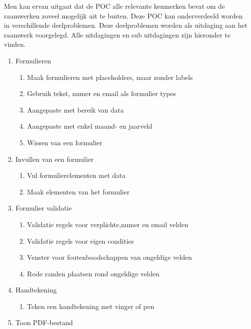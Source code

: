 Men kan ervan uitgaat dat de POC alle relevante kenmerken bevat om de raamwerken zoveel mogelijk uit te buiten. 
Deze POC kan onderverdeeld worden in verschillende deelproblemen.
Deze deelproblemen worden als uitdaging aan het raamwerk voorgelegd.
Alle uitdagingen en sub uitdagingen zijn hieronder te vinden.

\begin{enumerate}[label*=U \arabic*.]
\item \label{challenge:formulieren}Formulieren
\begin{enumerate}[label*=\arabic*]
\item Maak formulieren met placeholders,  maar zonder labels
\item Gebruik tekst, numer en email als formulier types
\item Aangepaste  met bereik van data
\item Aangepaste  met enkel maand- en jaarveld
\item Wissen van een formulier
\end{enumerate}
\item \label{challenge:invullen}Invullen van een formulier
\begin{enumerate}
\item Vul formulierelementen met data
\item Maak elementen van het formulier 
\end{enumerate}
\item \label{challenge:validatie}Formulier validatie
\begin{enumerate}
\item Validatie regels voor verplichte,numer en email velden
\item Validatie regels voor eigen condities
\item Venster voor foutenboodschappen van ongeldige velden
\item Rode randen plaatsen rond ongeldige velden
\end{enumerate}
\item \label{challenge:handtekening}Handtekening
\begin{enumerate}
\item Teken een handtekening met vinger of pen
\end{enumerate}
\item \label{challenge:pdf}Toon PDF-bestand
\begin{enumerate}

\end{enumerate}
\end{enumerate}
